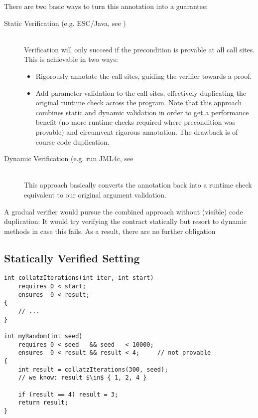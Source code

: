 There are two basic ways to turn this annotation into a guarantee:
\begin{description}
    \item[Static Verification (e.g. ESC/Java, see \cite{leino2000esc})]~\\
    Verification will only succeed if the precondition is provable at all call sites.
    This is achievable in two ways:
    \begin{itemize}
        \item
        Rigorously annotate the call sites, guiding the verifier towards a proof.
        \item 
        Add parameter validation to the call sites, effectively duplicating the original runtime check across the program.
        Note that this approach combines static and dynamic validation in order to get a performance benefit (no more runtime checks required where precondition was provable) and circumvent rigorous annotation.
        The drawback is of course code duplication.
    \end{itemize}
    
    
    \item[Dynamic Verification (e.g. run JML4c, see \cite{sarcar2010new}]~\\
    This approach basically converts the annotation back into a runtime check equivalent to our original argument validation.
\end{description}

A gradual verifier would pursue the combined approach without (visible) code duplication:
It would try verifying the contract statically but resort to dynamic methods in case this fails.
As a result, there are no further obligation 

\subsection{Statically Verified Setting}
\begin{lstlisting}
int collatzIterations(int iter, int start)
    requires 0 < start;
    ensures  0 < result;
{
    // ...
}

int myRandom(int seed)
    requires 0 < seed   && seed   < 10000;
    ensures  0 < result && result < 4;     // not provable
{
    int result = collatzIterations(300, seed);
    // we know: result $\in$ { 1, 2, 4 }
    
    if (result == 4) result = 3;
    return result;
}
\end{lstlisting}

